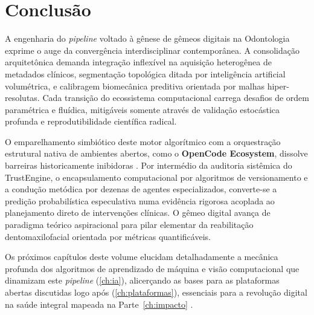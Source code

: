 \section{Conclusão}
\label{sec:conclusao-pipeline}

A engenharia do \textit{pipeline} voltado à gênese de gêmeos digitais na Odontologia exprime o auge da convergência interdisciplinar contemporânea. A consolidação arquitetônica demanda integração inflexível na aquisição heterogênea de metadados clínicos, segmentação topológica ditada por inteligência artificial volumétrica, e calibragem biomecânica preditiva orientada por malhas hiper-resolutas. Cada transição do ecossistema computacional carrega desafios de ordem paramétrica e fluídica, mitigáveis somente através de validação estocástica profunda e reprodutibilidade científica radical.

O emparelhamento simbiótico deste motor algorítmico com a orquestração estrutural nativa de ambientes abertos, como o \textbf{OpenCode Ecosystem}, dissolve barreiras historicamente inibidoras \cite{mdpi2025digital}. Por intermédio da auditoria sistêmica do TrustEngine, o encapsulamento computacional por algoritmos de versionamento e a condução metódica por dezenas de agentes especializados, converte-se a predição probabilística especulativa numa evidência rigorosa acoplada ao planejamento direto de intervenções clínicas. O gêmeo digital avança de paradigma teórico aspiracional para pilar elementar da reabilitação dentomaxilofacial orientada por métricas quantificáveis.

Os próximos capítulos deste volume elucidam detalhadamente a mecânica profunda dos algoritmos de aprendizado de máquina e visão computacional que dinamizam este \textit{pipeline} (\autoref{ch:ia}), alicerçando as bases para as plataformas abertas discutidas logo após (\autoref{ch:plataformas}), essenciais para a revolução digital na saúde integral mapeada na Parte~\ref{ch:impacto} \cite{duggal2026exploring, katsoulakis2024digital}.

